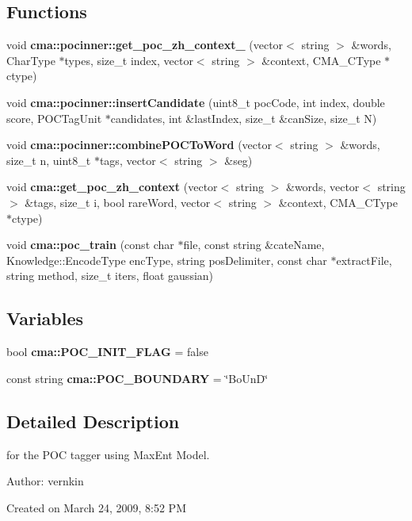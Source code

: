 \subsection*{Functions}
\begin{CompactItemize}
\item 
void {\bf cma::pocinner::get\_\-poc\_\-zh\_\-context\_} (vector$<$ string $>$ \&words, CharType $\ast$types, size\_\-t index, vector$<$ string $>$ \&context, CMA\_\-CType $\ast$ctype)
\item 
void {\bf cma::pocinner::insertCandidate} (uint8\_\-t pocCode, int index, double score, POCTagUnit $\ast$candidates, int \&lastIndex, size\_\-t \&canSize, size\_\-t N)
\item 
void {\bf cma::pocinner::combinePOCToWord} (vector$<$ string $>$ \&words, size\_\-t n, uint8\_\-t $\ast$tags, vector$<$ string $>$ \&seg)
\item 
void {\bf cma::get\_\-poc\_\-zh\_\-context} (vector$<$ string $>$ \&words, vector$<$ string $>$ \&tags, size\_\-t i, bool rareWord, vector$<$ string $>$ \&context, CMA\_\-CType $\ast$ctype)
\item 
void {\bf cma::poc\_\-train} (const char $\ast$file, const string \&cateName, Knowledge::EncodeType encType, string posDelimiter, const char $\ast$extractFile, string method, size\_\-t iters, float gaussian)
\end{CompactItemize}
\subsection*{Variables}
\begin{CompactItemize}
\item 
bool \textbf{cma::POC\_\-INIT\_\-FLAG} = false\label{namespacecma_835f0d6dd48a8037cf3d4a5a415a7323}

\item 
const string \textbf{cma::POC\_\-BOUNDARY} = \char`\"{}BoUnD\char`\"{}\label{namespacecma_6a315ae82b1eb14e31c1c281af3b041c}

\end{CompactItemize}


\subsection{Detailed Description}
for the POC tagger using MaxEnt Model. 

\begin{Desc}
\item[Author:]vernkin\end{Desc}
Created on March 24, 2009, 8:52 PM 